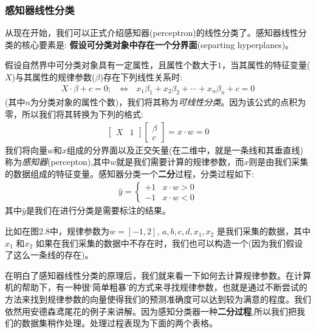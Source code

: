 \documentclass[12pt]{article}
\numberwithin{figure}{section}
\numberwithin{equation}{section}
\begin{document}
\subsubsection{感知器线性分类}

从现在开始，我们可以正式介绍感知器(perceptron)的线性分类了。感知器线性分类的核心要素是: \textbf{假设可分类对象中存在一个分界面}(separting hyperplanes)。


\begin{definition}
	假设自然界中可分类对象具有一定属性，且属性个数大于$1$，当其属性的特征变量($X$)与其属性的规律参数($\beta$)存在下列线性关系时:
	\begin{align*}
		X \cdot \beta + c  =0 ; \ \ \ \Leftrightarrow \ \ \ x_1\beta_1 + x_2 \beta_2 + \cdots + x_n \beta_n + c = 0
	\end{align*}
	(其中$n$为分类对象的属性个数)，我们将其称为\textit{可线性分类}。因为该公式的点积为零，所以我们将其转换为下列的格式:
	\begin{align*}
		\begin{bmatrix}
			X & 1
		\end{bmatrix} \begin{bmatrix}
			\beta \\
			c
		\end{bmatrix} = x \cdot w = 0 
	\end{align*}
	我们将向量$w$和$x$组成的分界面以及正交矢量(在二维中，就是一条线和其垂直线)称为\textit{感知器}(percepton),其中$w$就是我们需要计算的规律参数，而$x$则是由我们采集的数据组成的特征变量。感知器分类一个\textbf{二分}过程，分类过程如下:
	\begin{align*}
		\hat{y} = \begin{cases}
			+1 & x \cdot w > 0 \\
			-1 & x \cdot w < 0
		\end{cases}
	\end{align*}
	其中$\hat{y}$是我们在进行分类是需要标注的结果。
\end{definition}

\begin{example}
比如在图2.8中，规律参数为$w = [-1, 2]$, $a, b, c, d, x_1, x_2$ 是我们采集的数据，其中$x_1$ 和$x_2$ 如果在我们采集的数据中不存在时，我们也可以构造一个(因为我们假设了这么一条线的存在)。
\end{example}

在明白了感知器线性分类的原理后，我们就来看一下如何去计算规律参数。在计算机的帮助下，有一种很`简单粗暴’的方式来寻找规律参数，也就是通过不断尝试的方法来找到规律参数的向量使得我们的预测准确度可以达到较为满意的程度。我们依然用安德森鸢尾花的例子来讲解。因为感知分类器一种\textbf{二分过程},所以我们把我们的数据集稍作处理。处理过程表现为下面的两个表格。
\end{document}

